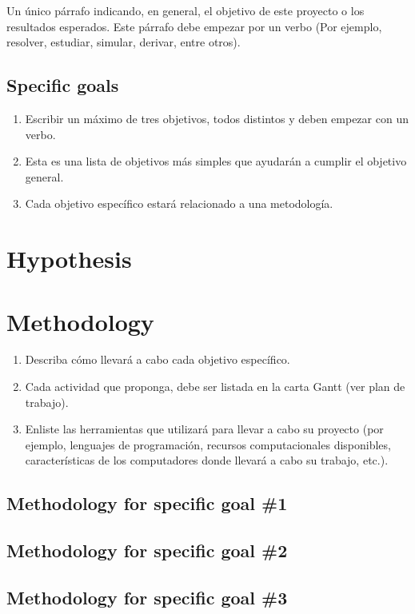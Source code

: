 \documentclass[demo, MAIN.tex]{subfiles}
\begin{document}
Un único párrafo indicando, en general, el objetivo de este proyecto o
los resultados esperados. Este párrafo debe empezar por un verbo (Por
ejemplo, resolver, estudiar, simular, derivar, entre otros).

\subsection{Specific goals}
\begin{enumerate}
\item Escribir un máximo de tres objetivos, todos distintos y deben empezar con un verbo.
\item Esta es una lista de objetivos más simples que ayudarán a cumplir el objetivo general.
\item Cada objetivo específico estará relacionado a una metodología.
\end{enumerate}

\section{Hypothesis}


\section{Methodology}

\begin{enumerate}
\item Describa cómo llevará a cabo cada objetivo específico. 
\item Cada actividad que proponga, debe ser listada en la carta Gantt (ver plan de trabajo).
\item Enliste las herramientas que utilizará para llevar a cabo su proyecto (por ejemplo, lenguajes de programación, recursos computacionales disponibles, características de los computadores donde llevará a cabo su trabajo, etc.).  
\end{enumerate}

\subsection{Methodology for specific goal \#1} 

\subsection{Methodology for specific goal \#2}

\subsection{Methodology for specific goal \#3}
\end{document}
